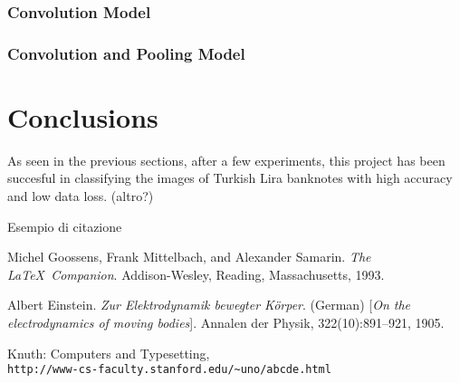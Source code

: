 \documentclass[a4paper,12pt]{article}
\begin{document}
\subsubsection{Convolution Model}


\subsubsection{Convolution and Pooling Model}








\newpage
\section{Conclusions}
As seen in the previous sections, after a few experiments, this project has been succesful in classifying the images of Turkish 
Lira banknotes with high accuracy and low data loss.
(altro?)




Esempio di citazione\cite{latexcompanion}

\newpage
{}
\begin{thebibliography}{9}
Michel Goossens, Frank Mittelbach, and Alexander Samarin. 
\textit{The \LaTeX\ Companion}. 
Addison-Wesley, Reading, Massachusetts, 1993.

Albert Einstein. 
\textit{Zur Elektrodynamik bewegter K{\"o}rper}. (German) 
[\textit{On the electrodynamics of moving bodies}]. 
Annalen der Physik, 322(10):891–921, 1905.

Knuth: Computers and Typesetting,
\\\texttt{http://www-cs-faculty.stanford.edu/\~{}uno/abcde.html}
\end{thebibliography}
\end{document}
